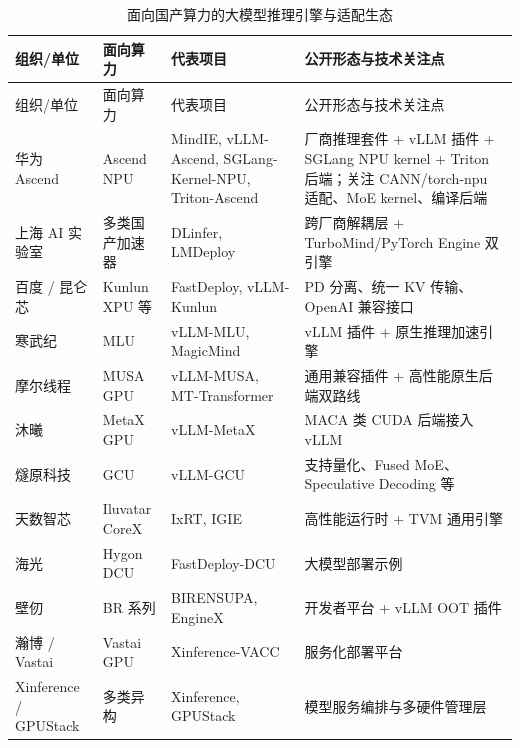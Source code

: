 \begin{small}
\begin{longtable}{L{2.3cm}L{2.0cm}L{3.0cm}L{6.8cm}}
\caption{面向国产算力的大模型推理引擎与适配生态}
\label{tab:domestic-inference-engines} \\
\toprule
组织/单位 & 面向算力 & 代表项目 & 公开形态与技术关注点 \\
\midrule
\endfirsthead
\toprule
组织/单位 & 面向算力 & 代表项目 & 公开形态与技术关注点 \\
\midrule
\endhead

华为 Ascend & Ascend NPU & MindIE, vLLM-Ascend, SGLang-Kernel-NPU, Triton-Ascend & 厂商推理套件 + vLLM 插件 + SGLang NPU kernel + Triton 后端；关注 CANN/torch-npu 适配、MoE kernel、编译后端\cite{huawei_mindie_2026,vllm_ascend_2026,sglang_kernel_npu_2026,triton_ascend_2026} \\

上海 AI 实验室 & 多类国产加速器 & DLinfer, LMDeploy & 跨厂商解耦层 + TurboMind/PyTorch Engine 双引擎\cite{deeplink_dlinfer_2026,lmdeploy_2026} \\

百度 / 昆仑芯 & Kunlun XPU 等 & FastDeploy, vLLM-Kunlun & PD 分离、统一 KV 传输、OpenAI 兼容接口\cite{fastdeploy_2026,vllm_kunlun_2026} \\

寒武纪 & MLU & vLLM-MLU, MagicMind & vLLM 插件 + 原生推理加速引擎\cite{cambricon_vllm_mlu_2026,cambricon_magicmind_2026} \\

摩尔线程 & MUSA GPU & vLLM-MUSA, MT-Transformer & 通用兼容插件 + 高性能原生后端双路线\cite{moorethreads_vllm_musa_2026,moorethreads_vllm_mtt_2026} \\

沐曦 & MetaX GPU & vLLM-MetaX & MACA 类 CUDA 后端接入 vLLM\cite{metax_vllm_2026} \\

燧原科技 & GCU & vLLM-GCU & 支持量化、Fused MoE、Speculative Decoding 等\cite{enflame_vllm_gcu_2026} \\

天数智芯 & Iluvatar CoreX & IxRT, IGIE & 高性能运行时 + TVM 通用引擎\cite{iluvatar_deepspark_inference_2026} \\

海光 & Hygon DCU & FastDeploy-DCU & 大模型部署示例\cite{hygon_fastdeploy_2026} \\

壁仞 & BR 系列 & BIRENSUPA, EngineX & 开发者平台 + vLLM OOT 插件\cite{biren_developer_2026} \\

瀚博 / Vastai & Vastai GPU & Xinference-VACC & 服务化部署平台\cite{vastai_developer_2026} \\

Xinference / GPUStack & 多类异构 & Xinference, GPUStack & 模型服务编排与多硬件管理层\cite{xinference_heterogeneous_2026,gpustack_2026} \\

\bottomrule
\end{longtable}
\end{small}

